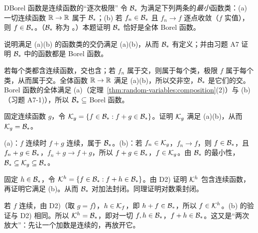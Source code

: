 \begin{probleme}{D}{Borel 函数是连续函数的“逐次极限”}
令 $\mathcal{B}_\ast$ 为满足下列两条的\emph{最小}函数类：(a) 一切连续函数 $\mathbb{R}\to\mathbb{R}$ 属于 $\mathcal{B}_\ast$；(b) 若 $f_n\in\mathcal{B}_\ast$ 且 $f_n\to f$ 逐点收敛（$f$ 实值），则 $f\in\mathcal{B}_\ast$。（$\mathcal{B}_\ast$ 称为 。）本题证明 $\mathcal{B}_\ast$ 恰好是全体 Borel 函数。
\begin{questions}
\item 说明满足 (a)(b) 的函数类的交仍满足 (a)(b)，从而 $\mathcal{B}_\ast$ 有定义；并由习题 A7 证明 $\mathcal{B}_\ast$ 中的函数都是 Borel 函数。
\begin{solution}
若每个类都含连续函数，交也含；若 $f_n$ 属于交，则属于每个类，极限 $f$ 属于每个类，从而属于交。全体函数 $\mathbb{R}\to\mathbb{R}$ 满足 (a)(b)，所以交非空，$\mathcal{B}_\ast$ 是它们的交。Borel 函数的全体满足 (a)（定理~\ref{thm:random-variables:composition}(2)）与 (b)（习题 A7-1)），所以 $\mathcal{B}_\ast\subseteq$ Borel 函数。
\end{solution}
\item 固定连续函数 $g$，令 $\mathcal{K}_g=\{f\in\mathcal{B}_\ast: f+g\in\mathcal{B}_\ast\}$。证明 $\mathcal{K}_g$ 满足 (a)(b)，从而 $\mathcal{K}_g=\mathcal{B}_\ast$。
\begin{solution}
(a)：$f$ 连续时 $f+g$ 连续，属于 $\mathcal{B}_\ast$。(b)：若 $f_n\in\mathcal{K}_g$，$f_n\to f$，则 $f\in\mathcal{B}_\ast$，且 $f_n+g\in\mathcal{B}_\ast$，$f_n+g\to f+g$，所以 $f+g\in\mathcal{B}_\ast$，$f\in\mathcal{K}_g$。由 $\mathcal{B}_\ast$ 的最小性，$\mathcal{B}_\ast\subseteq\mathcal{K}_g\subseteq\mathcal{B}_\ast$。
\end{solution}
\item 固定 $h\in\mathcal{B}_\ast$，令 $\mathcal{K}^h=\{f\in\mathcal{B}_\ast: f+h\in\mathcal{B}_\ast\}$。由 D2) 证明 $\mathcal{K}^h$ 包含连续函数，再证明它满足 (b)。从而 $\mathcal{B}_\ast$ 对加法封闭。同理证明对数乘封闭。
\begin{solution}
若 $f$ 连续，由 D2)（取 $g=f$），$h\in\mathcal{K}_f$，即 $h+f\in\mathcal{B}_\ast$，所以 $f\in\mathcal{K}^h$。(b) 的验证与 D2) 相同。所以 $\mathcal{K}^h=\mathcal{B}_\ast$，即对一切 $f,h\in\mathcal{B}_\ast$，$f+h\in\mathcal{B}_\ast$。这又是“两次放大”：先让一个加数是连续的，再放开它。


\end{solution}
\end{questions}
\end{probleme}

